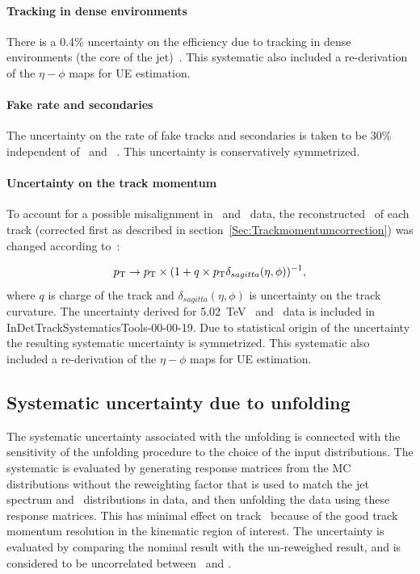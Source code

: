 \paragraph{Tracking in dense environments}
There is a 0.4\% uncertainty on the efficiency due to tracking in dense environments (the core of the jet)~\cite{ref:tracktwiki}.
This systematic also included a re-derivation of the $\eta-\phi$ maps for UE estimation.

\paragraph{Fake rate and secondaries}
The uncertainty on the rate of fake tracks and secondaries is taken to be 30\% independent of \pttrk\ and \etatrk~\cite{ref:tracktwiki, Nachman:2259091}.
This uncertainty is conservatively symmetrized.

\paragraph{Uncertainty on the track momentum}
To account for a possible misalignment in \pp\ and \PbPb\ data, the reconstructed \pT\ of each track (corrected first as described in section~\ref{Sec:Trackmomentumcorrection}) was changed according to~\cite{TrackingRec}:

\begin{equation}
\mbox{$p_{\mathrm{T}}$} \rightarrow \mbox{$p_{\mathrm{T}}$} \times (1 + q \times \mbox{$p_{\mathrm{T}}$} \delta_{sagitta}(\eta, \phi))^{-1},
\end{equation}
where $q$ is charge of the track and $\delta_{sagitta}(\eta, \phi)$ is uncertainty on the track curvature.
The uncertainty derived for 5.02~TeV \pp\ and \PbPb\ data is included in InDetTrackSystematicsTools-00-00-19.
Due to statistical origin of the uncertainty the resulting systematic uncertainty is symmetrized.
This systematic also included a re-derivation of the $\eta-\phi$ maps for UE estimation.



\subsection{Systematic uncertainty due to unfolding}
The systematic uncertainty associated with the unfolding is connected with the sensitivity of the unfolding procedure to the choice of the input distributions.
The systematic is evaluated by generating response matrices from the MC distributions without the reweighting factor that is used to match the jet spectrum and \Dptr\ distributions in data, and then unfolding the data using these response matrices.
This has minimal effect on track \pt\ because of the good track momentum resolution in the kinematic region of interest.
The uncertainty is evaluated by comparing the nominal result with the un-reweighed result, and is considered to be uncorrelated between \pbpb\ and \pp.


